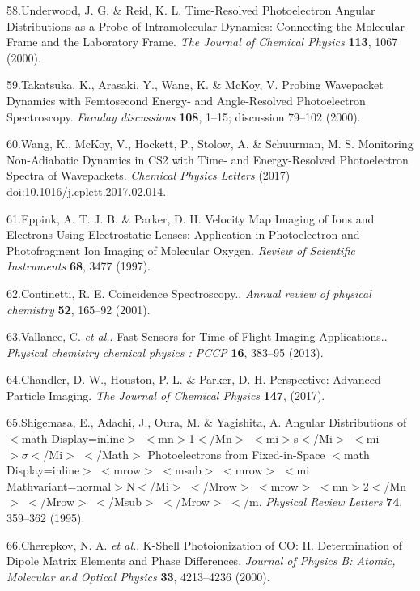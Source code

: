 \documentclass[10pt]{article}
\begin{document}
\label{csl:58}58.Underwood, J. G. \& Reid, K. L. {Time-Resolved Photoelectron Angular Distributions as a Probe of Intramolecular Dynamics: {{Connecting}} the Molecular Frame and the Laboratory Frame}. \textit{The Journal of Chemical Physics} \textbf{113}, 1067 (2000).

\label{csl:59}59.Takatsuka, K., Arasaki, Y., Wang, K. \& McKoy, V. {Probing Wavepacket Dynamics with Femtosecond Energy- and Angle-Resolved Photoelectron Spectroscopy}. \textit{Faraday discussions} \textbf{108}, 1–15; discussion 79–102 (2000).

\label{csl:60}60.Wang, K., McKoy, V., Hockett, P., Stolow, A. \& Schuurman, M. S. {Monitoring Non-Adiabatic Dynamics in {{CS2}} with Time- and Energy-Resolved Photoelectron Spectra of Wavepackets}. \textit{Chemical Physics Letters} (2017) doi:10.1016/j.cplett.2017.02.014.

\label{csl:61}61.Eppink, A. T. J. B. \& Parker, D. H. {Velocity Map Imaging of Ions and Electrons Using Electrostatic Lenses: {{Application}} in Photoelectron and Photofragment Ion Imaging of Molecular Oxygen}. \textit{Review of Scientific Instruments} \textbf{68}, 3477 (1997).

\label{csl:62}62.Continetti, R. E. {Coincidence Spectroscopy.}. \textit{Annual review of physical chemistry} \textbf{52}, 165–92 (2001).

\label{csl:63}63.Vallance, C. \textit{et al.}. {Fast Sensors for Time-of-Flight Imaging Applications.}. \textit{Physical chemistry chemical physics : PCCP} \textbf{16}, 383–95 (2013).

\label{csl:64}64.Chandler, D. W., Houston, P. L. \& Parker, D. H. {Perspective: {{Advanced}} Particle Imaging}. \textit{The Journal of Chemical Physics} \textbf{147}, (2017).

\label{csl:65}65.Shigemasa, E., Adachi, J., Oura, M. \& Yagishita, A. {Angular {{Distributions}} of {$<$}math Display=inline{$>$} {$<$}mn{$>$}1{$<$}/Mn{$>$} {$<$}mi{$>$}s{$<$}/Mi{$>$} {$<$}mi{$>\sigma<$}/Mi{$>$} {$<$}/Math{$>$} {{Photoelectrons}} from {{Fixed}}-in-{{Space}} {$<$}math Display=inline{$>$} {$<$}mrow{$>$} {$<$}msub{$>$} {$<$}mrow{$>$} {$<$}mi Mathvariant=normal{$>$}{{N}}{$<$}/Mi{$>$} {$<$}/Mrow{$>$} {$<$}mrow{$>$} {$<$}mn{$>$}2{$<$}/Mn{$>$} {$<$}/Mrow{$>$} {$<$}/Msub{$>$} {$<$}/Mrow{$>$} {$<$}/m}. \textit{Physical Review Letters} \textbf{74}, 359–362 (1995).

\label{csl:66}66.Cherepkov, N. A. \textit{et al.}. {K-Shell Photoionization of {{CO}}: {{II}}. {{Determination}} of Dipole Matrix Elements and Phase Differences}. \textit{Journal of Physics B: Atomic, Molecular and Optical Physics} \textbf{33}, 4213–4236 (2000).
\end{document}
